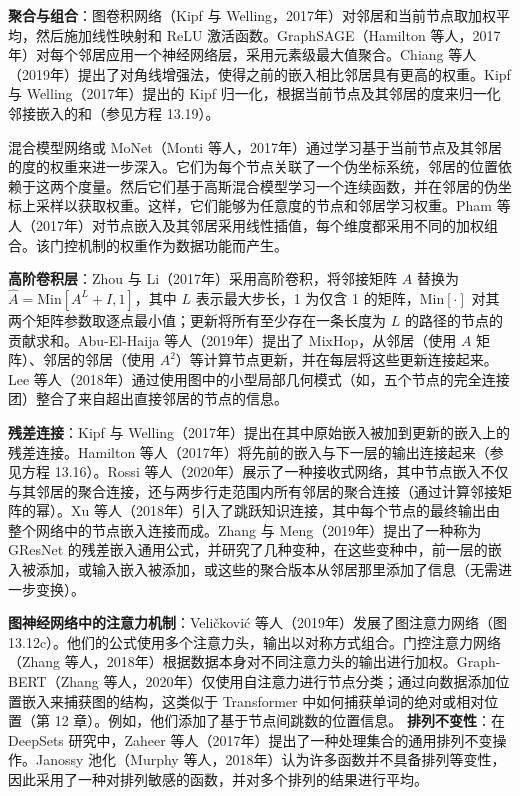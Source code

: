 \textbf{聚合与组合}：图卷积网络（Kipf 与 Welling，2017年）对邻居和当前节点取加权平均，然后施加线性映射和 ReLU 激活函数。GraphSAGE（Hamilton 等人，2017年）对每个邻居应用一个神经网络层，采用元素级最大值聚合。Chiang 等人（2019年）提出了对角线增强法，使得之前的嵌入相比邻居具有更高的权重。Kipf 与 Welling（2017年）提出的 Kipf 归一化，根据当前节点及其邻居的度来归一化邻接嵌入的和（参见方程 13.19）。

混合模型网络或 MoNet（Monti 等人，2017年）通过学习基于当前节点及其邻居的度的权重来进一步深入。它们为每个节点关联了一个伪坐标系统，邻居的位置依赖于这两个度量。然后它们基于高斯混合模型学习一个连续函数，并在邻居的伪坐标上采样以获取权重。这样，它们能够为任意度的节点和邻居学习权重。Pham 等人（2017年）对节点嵌入及其邻居采用线性插值，每个维度都采用不同的加权组合。该门控机制的权重作为数据功能而产生。

\textbf{高阶卷积层}：Zhou 与 Li（2017年）采用高阶卷积，将邻接矩阵 \(A\) 替换为 \(\hat{A} = \text{Min}[A^L + I, 1]\)，其中 \(L\) 表示最大步长，1 为仅含 1 的矩阵，\(\text{Min}[\cdot]\) 对其两个矩阵参数取逐点最小值；更新将所有至少存在一条长度为 \(L\) 的路径的节点的贡献求和。Abu-El-Haija 等人（2019年）提出了 \(\text{MixHop}\)，从邻居（使用 \(A\) 矩阵）、邻居的邻居（使用 \(A^2\)）等计算节点更新，并在每层将这些更新连接起来。Lee 等人（2018年）通过使用图中的小型局部几何模式（如，五个节点的完全连接团）整合了来自超出直接邻居的节点的信息。

\textbf{残差连接}：Kipf 与 Welling（2017年）提出在其中原始嵌入被加到更新的嵌入上的残差连接。Hamilton 等人（2017年）将先前的嵌入与下一层的输出连接起来（参见方程 13.16）。Rossi 等人（2020年）展示了一种接收式网络，其中节点嵌入不仅与其邻居的聚合连接，还与两步行走范围内所有邻居的聚合连接（通过计算邻接矩阵的幂）。Xu 等人（2018年）引入了跳跃知识连接，其中每个节点的最终输出由整个网络中的节点嵌入连接而成。Zhang 与 Meng（2019年）提出了一种称为 GResNet 的残差嵌入通用公式，并研究了几种变种，在这些变种中，前一层的嵌入被添加，或输入嵌入被添加，或这些的聚合版本从邻居那里添加了信息（无需进一步变换）。

\textbf{图神经网络中的注意力机制}：Veličković 等人（2019年）发展了图注意力网络（图 13.12c）。他们的公式使用多个注意力头，输出以对称方式组合。门控注意力网络（Zhang 等人，2018年）根据数据本身对不同注意力头的输出进行加权。Graph-BERT（Zhang 等人，2020年）仅使用自注意力进行节点分类；通过向数据添加位置嵌入来捕获图的结构，这类似于 Transformer 中如何捕获单词的绝对或相对位置（第 12 章）。例如，他们添加了基于节点间跳数的位置信息。
\textbf{排列不变性}：在 DeepSets 研究中，Zaheer 等人（2017年）提出了一种处理集合的通用排列不变操作。Janossy 池化（Murphy 等人，2018年）认为许多函数并不具备排列等变性，因此采用了一种对排列敏感的函数，并对多个排列的结果进行平均。

